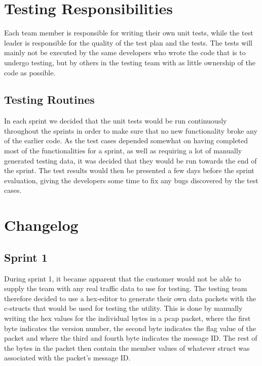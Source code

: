 \section{Testing Responsibilities}
Each team member is responsible for writing their own unit tests, while the test leader is responsible for the quality of the test plan and the tests.
The tests will mainly not be executed by the same developers who wrote the code that is to undergo testing, but by others in the testing team with as little ownership of the code as possible.

\subsection{Testing Routines}
In each sprint we decided that the unit tests would be run continuously throughout the sprints in order to make sure that no new functionality broke any of the earlier code. As the test cases depended somewhat on having completed most of the functionalities for a sprint, as well as requiring a lot of manually generated testing data, it was decided that they would be run towards the end of the sprint. The test results would then be presented a few days before the sprint evaluation, giving the developers some time to fix any bugs discovered by the test cases. 

\section{Changelog}

\subsection{Sprint 1}
During sprint 1, it became apparent that the customer would not be able to supply the team with any real traffic data to use for testing. The testing team therefore decided to use a hex-editor to generate their own data \glspl{packet} with the \Gls{c}-\glspl{struct} that would be used for testing the \gls{utility}. This is done by manually writing the hex values for the individual bytes in a pcap \gls{packet}, where the first byte indicates the version number, the second byte indicates the flag value of the \gls{packet} and where the third and fourth byte indicates the message ID. The rest of the bytes in the \gls{packet} then contain the \gls{member} values of whatever \gls{struct} was associated with the \gls{packet}'s message ID.

